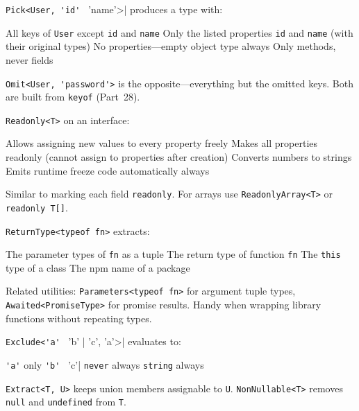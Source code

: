 \question[4]
\lstinline[style=tsinline]|Pick<User, 'id' | 'name'>| produces a type with:
\begin{choices}
  \choice All keys of \lstinline[style=tsinline]|User| except \lstinline[style=tsinline]|id| and \lstinline[style=tsinline]|name|
  \CorrectChoice Only the listed properties \lstinline[style=tsinline]|id| and \lstinline[style=tsinline]|name| (with their original types)
  \choice No properties---empty object type always
  \choice Only methods, never fields
\end{choices}
\begin{solution}
  \lstinline[style=tsinline]|Omit<User, 'password'>| is the opposite---everything but the omitted keys. Both are built from \lstinline[style=tsinline]|keyof| (Part~28).
\end{solution}

\question[4]
\lstinline[style=tsinline]|Readonly<T>| on an interface:
\begin{choices}
  \choice Allows assigning new values to every property freely
  \CorrectChoice Makes all properties readonly (cannot assign to properties after creation)
  \choice Converts numbers to strings
  \choice Emits runtime freeze code automatically always
\end{choices}
\begin{solution}
  Similar to marking each field \lstinline[style=tsinline]|readonly|. For arrays use \lstinline[style=tsinline]|ReadonlyArray<T>| or \lstinline[style=tsinline]|readonly T[]|.
\end{solution}

\question[4]
\lstinline[style=tsinline]|ReturnType<typeof fn>| extracts:
\begin{choices}
  \choice The parameter types of \lstinline[style=tsinline]|fn| as a tuple
  \CorrectChoice The return type of function \lstinline[style=tsinline]|fn|
  \choice The \lstinline[style=tsinline]|this| type of a class
  \choice The npm name of a package
\end{choices}
\begin{solution}
  Related utilities: \lstinline[style=tsinline]|Parameters<typeof fn>| for argument tuple types, \lstinline[style=tsinline]|Awaited<PromiseType>| for promise results. Handy when wrapping library functions without repeating types.
\end{solution}

\question[4]
\lstinline[style=tsinline]|Exclude<'a' | 'b' | 'c', 'a'>| evaluates to:
\begin{choices}
  \choice \lstinline[style=tsinline]|'a'| only
  \CorrectChoice \lstinline[style=tsinline]|'b' | 'c'|
  \choice \lstinline[style=tsinline]|never| always
  \choice \lstinline[style=tsinline]|string| always
\end{choices}
\begin{solution}
  \lstinline[style=tsinline]|Extract<T, U>| keeps union members assignable to \lstinline[style=tsinline]|U|. \lstinline[style=tsinline]|NonNullable<T>| removes \lstinline[style=tsinline]|null| and \lstinline[style=tsinline]|undefined| from \lstinline[style=tsinline]|T|.
\end{solution}

